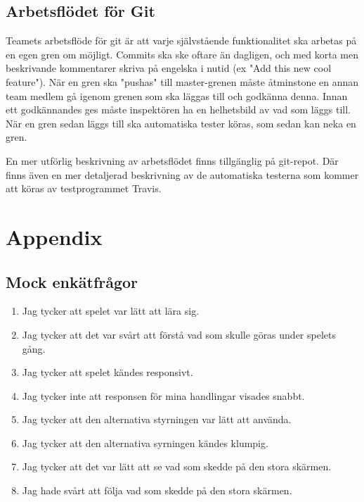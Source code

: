 \documentclass[10pt]{article}
\begin{document}
	\subsection{Arbetsflödet för Git}
	Teamets arbetsflöde för git är att varje självstående funktionalitet ska arbetas på en egen gren om möjligt. Commits ska ske oftare än dagligen, och med korta men beskrivande kommentarer skriva på engelska i nutid (ex "Add this new cool feature"). När en gren ska "pushas" till master-grenen måste åtminstone en annan team medlem gå igenom grenen som ska läggas till och godkänna denna. Innan ett godkännandes ges måste inspektören ha en helhetsbild av vad som läggs till. När en gren sedan läggs till ska automatiska tester köras, som sedan kan neka en gren.
	
	En mer utförlig beskrivning av arbetsflödet finns tillgänglig på git-repot. Där finns även en mer detaljerad beskrivning av de automatiska testerna som kommer att köras av testprogrammet Travis.
	
\pagebreak
\section*{Appendix}
	\subsection*{Mock enkätfrågor}
	\begin{enumerate}
		\item Jag tycker att spelet var lätt att lära sig. 
		\item Jag tycker att det var svårt att förstå vad som skulle göras under spelets gång.
		\item Jag tycker att spelet kändes responsivt.
		\item Jag tycker inte att responsen för mina handlingar visades snabbt.
		\item Jag tycker att den alternativa styrningen var lätt att använda.
		\item Jag tycker att den alternativa syrningen kändes klumpig.
		\item Jag tycker att det var lätt att se vad som skedde på den stora skärmen.
		\item Jag hade svårt att följa vad som skedde på den stora skärmen.
		
	\end{enumerate}




	
\pagebreak

\printbibliography
{}
\end{document}
